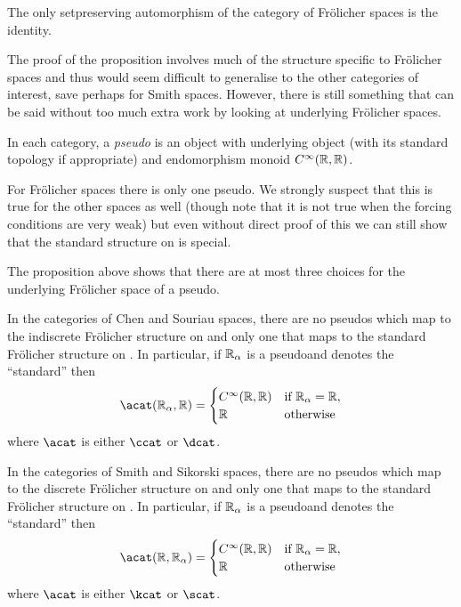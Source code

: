 \documentclass[%
a4paper,%
arxiv,%
defaults
]{myclass}
\begin{document}
\begin{corollary}
The only set\enhyp{}preserving automorphism of the category of Fr\"olicher spaces is the identity. \noproof
\end{corollary}

The proof of the proposition involves much of the structure specific to Fr\"olicher spaces and thus would seem difficult to generalise to the other categories of interest, save perhaps for Smith spaces.
However, there is still something that can be said without too much extra work by looking at underlying Fr\"olicher spaces.

\begin{defn}
In each category, a \emph{pseudo\enhyp{}\R{}} is an object with underlying object \R (with its standard topology if appropriate) and endomorphism monoid \(C^\infty(\mathbb{R},\mathbb{R})\).
\end{defn}

For Fr\"olicher spaces there is only one pseudo\enhyp{}\R.
We strongly suspect that this is true for the other spaces as well (though note that it is not true when the forcing conditions are very weak) but even without direct proof of this we can still show that the standard structure on \R is special.

The proposition above shows that there are at most three choices for the underlying Fr\"olicher space of a pseudo\enhyp{}\R.

\begin{proposition}
In the categories of Chen and Souriau spaces, there are no pseudo\enhyp{}\R{}s which map to the indiscrete Fr\"olicher structure on \R and only one that maps to the standard Fr\"olicher structure on \R.
In particular, if \(\mathbb{R}_\alpha\) is a pseudo\enhyp{}\R and \R denotes the ``standard'' \R then
%
\[
  \Hom{\acat}{\R_\alpha}{\R} = \begin{cases}
  \Ci(\R,\R) & \text{if } \R_\alpha = \R, \\
%
  \R & \text{otherwise}
  \end{cases}
\]
%
where \(\acat\) is either \(\ccat\) or \(\dcat\).

In the categories of Smith and Sikorski spaces, there are no pseudo\enhyp{}\R{}s which map to the discrete Fr\"olicher structure on \R and only one that maps to the standard Fr\"olicher structure on \R.
In particular, if \(\mathbb{R}_\alpha\) is a pseudo\enhyp{}\R and \R denotes the ``standard'' \R then
%
\[
  \Hom{\acat}{\R}{\R_\alpha} = \begin{cases}
  \Ci(\R,\R) & \text{if } \R_\alpha = \R, \\
%
  \R & \text{otherwise}
  \end{cases}
\]
%
where \(\acat\) is either \(\kcat\) or \(\scat\).
\end{proposition}
\end{document}
